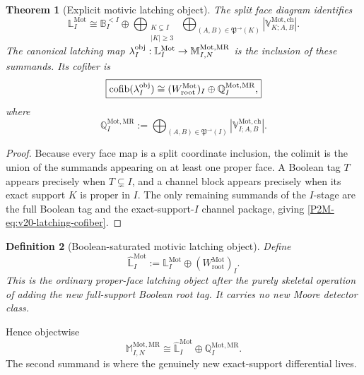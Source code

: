 \documentclass[11pt]{article}
\newtheorem{theorem}{Theorem}[section]
\newtheorem{definition}[theorem]{Definition}
\theoremstyle{remark}
\newcommand{\cofib}{\operatorname{cofib}}
\newcommand{\Mot}{\mathrm{Mot}}
\newcommand{\rootc}{\mathrm{root}}
\newcommand{\MR}{\mathrm{MR}}
\begin{document}
\begin{theorem}[Explicit motivic latching object]
\label{P2M-thm:v20-explicit-motivic-latching}
The split face diagram identifies
\begin{equation}
 \boxed{
 \mathbb L_I^{\Mot}
 \cong
 \mathbb B_I^{<I}
 \oplus
 \bigoplus_{\substack{K\subsetneq I\\|K|\ge3}}
 \ \bigoplus_{(A,B)\in\mathfrak P^\to(K)}
 |\mathbb V_{K;A,B}^{\Mot,\mathrm{ch}}|.}
\end{equation}
The canonical latching map
$\lambda_I^{\rm obj}:\mathbb L_I^{\Mot}\to
\mathbb M_{I,N}^{\Mot,\MR}$ is the inclusion of these summands.  Its cofiber
is
\begin{equation}\label{P2M-eq:v20-latching-cofiber}
 \boxed{
 \cofib(\lambda_I^{\rm obj})
 \cong
 (W_{\rootc}^{\Mot})_I
 \oplus
 \mathbb Q_I^{\Mot,\MR},}
\end{equation}
where
\begin{equation}
 \boxed{
 \mathbb Q_I^{\Mot,\MR}
 :=
 \bigoplus_{(A,B)\in\mathfrak P^\to(I)}
 |\mathbb V_{I;A,B}^{\Mot,\mathrm{ch}}|.}
\end{equation}
\end{theorem}

\begin{proof}
Because every face map is a split coordinate inclusion, the colimit is the
union of the summands appearing on at least one proper face.  A Boolean tag
$T$ appears precisely when $T\subsetneq I$, and a channel block appears
precisely when its exact support $K$ is proper in $I$.  The only remaining
summands of the $I$-stage are the full Boolean tag and the exact-support-$I$
channel package, giving \eqref{P2M-eq:v20-latching-cofiber}.
\end{proof}

\begin{definition}[Boolean-saturated motivic latching object]
\label{P2M-def:v20-boolean-saturated-latching}
Define
\begin{equation}
 \boxed{
 \widehat{\mathbb L}_I^{\Mot}
 :=
 \mathbb L_I^{\Mot}\oplus(W_{\rootc}^{\Mot})_I.}
\end{equation}
This is the ordinary proper-face latching object after the purely skeletal
operation of adding the new full-support Boolean root tag.  It carries no new
Moore detector class.
\end{definition}

Hence objectwise
\begin{equation}\label{P2M-eq:v20-object-reedy-splitting}
 \boxed{
 \mathbb M_{I,N}^{\Mot,\MR}
 \cong
 \widehat{\mathbb L}_I^{\Mot}
 \oplus
 \mathbb Q_I^{\Mot,\MR}.}
\end{equation}
The second summand is where the genuinely new exact-support differential
lives.
\end{document}
